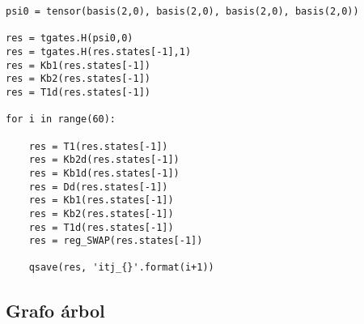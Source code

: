 \begin{verbatim}
psi0 = tensor(basis(2,0), basis(2,0), basis(2,0), basis(2,0))

res = tgates.H(psi0,0)
res = tgates.H(res.states[-1],1)
res = Kb1(res.states[-1])
res = Kb2(res.states[-1])
res = T1d(res.states[-1])

for i in range(60):
    
    res = T1(res.states[-1])
    res = Kb2d(res.states[-1])
    res = Kb1d(res.states[-1])
    res = Dd(res.states[-1])
    res = Kb1(res.states[-1])
    res = Kb2(res.states[-1])
    res = T1d(res.states[-1])
    res = reg_SWAP(res.states[-1])
    
    qsave(res, 'itj_{}'.format(i+1))

\end{verbatim}

\subsection{Grafo árbol}

